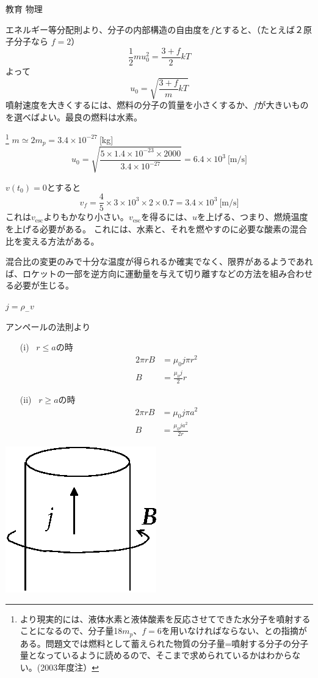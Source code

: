 \documentclass[fleqn]{jbook}
\begin{document}
\begin{answer}{教育 物理}{}
\begin{subanswers}
\begin{subsubanswers}
\SubSubAnswer
エネルギー等分配則より、分子の内部構造の自由度を$f$とすると、（たとえば２原子分子なら $f=2$）
\[
\frac{1}{2}mu_0^2=\frac{3+f}{2}kT
\]
よって
\[
u_0=\sqrt{\frac{3+f}{m}kT}
\]
噴射速度を大きくするには、燃料の分子の質量を小さくするか、$f$が大きいものを選べばよい。最良の燃料は水素。

\SubSubAnswer\footnote{より現実的には、液体水素と液体酸素を反応させてできた水分子を噴射することになるので、分子量18$m_p$、$f=6$を用いなければならない、との指摘がある。問題文では燃料として蓄えられた物質の分子量=噴射する分子の分子量となっているように読めるので、そこまで求められているかはわからない。(2003年度注）}
$m\simeq 2m_p=3.4\times 10^{-27}\ $[kg]
\[
u_0=\sqrt{\frac{5\times 1.4\times 10^{-23}\times 2000}{3.4\times 10^{-27}}}=6.4\times 10^3\ \text{[m/s]}
\]

\SubSubAnswer
$v(t_0)=0$とすると
\[
v_f=\frac{4}{5}\times 3\times 10^3\times 2\times 0.7=3.4\times 10^3\ \text{[m/s]}
\]
これは$v_{\text{esc}}$よりもかなり小さい。$v_{\text{esc}}$を得るには、$u$を上げる、つまり、燃焼温度を上げる必要がある。
これには、水素と、それを燃やすのに必要な酸素の混合比を変える方法がある。

混合比の変更のみで十分な温度が得られるか確実でなく、限界があるようであれば、ロケットの一部を逆方向に運動量を与えて切り離すなどの方法を組み合わせる必要が生じる。
\end{subsubanswers}

\SubAnswer
\begin{subsubanswers}

\SubSubAnswer
$ j=\rho_-v $

\SubSubAnswer

\parbox[t]{.5\linewidth}{
アンペールの法則より
\begin{enumerate}
\item[(i)]
~$r \leq a$の時
\begin{align*}
2\pi rB&=\mu_0j\pi r^2 \\
B&=\frac{\mu_0j}{2}r
\end{align*}

\item[(ii)]
~$r \geq a$の時
\begin{align*}
2\pi rB&=\mu_0j\pi a^2 \\
B&=\frac{\mu_0ja^2}{2r}
\end{align*}
\end{enumerate}
}
\parbox[t]{.5\linewidth}{
\begin{center}
\includegraphics[clip]{1999phys2-1.eps}
\end{center}
}


\end{subsubanswers}
\end{subanswers}
\end{answer}
\end{document}
